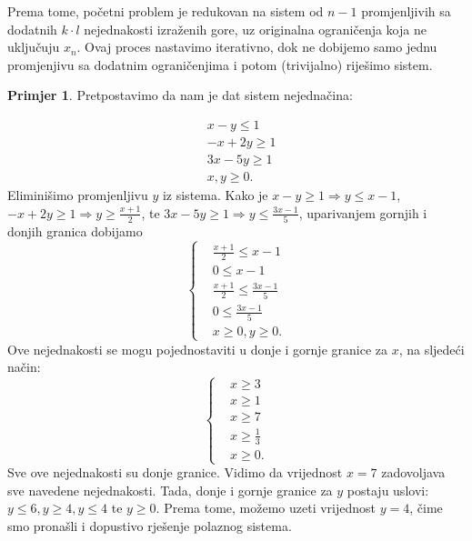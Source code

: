 \documentclass[b5paper, utf8, 11pt, colorlinks]{book}
\theoremstyle{definition}
\newtheorem{primjer}{Primjer}[chapter]
\begin{document}
Prema tome, početni problem je redukovan na sistem od $n-1$ promjenljivih sa dodatnih  $k \cdot l$ nejednakosti izraženih gore, uz originalna ograničenja koja ne uključuju $x_n$. Ovaj proces nastavimo iterativno, dok ne dobijemo samo jednu promjenjivu sa dodatnim ograničenjima  i potom (trivijalno) riješimo sistem. 

\begin{primjer} Pretpostavimo da nam je dat sistem nejednačina:
\end{primjer}
\begin{align*}
	&x - y \leq 1 \\
	&-x + 2y \geq 1 \\
	& 3x - 5y \geq 1 \\
	& x,y \geq 0.
\end{align*}
Eliminišimo promjenljivu $y$ iz sistema. Kako je $x-y \geq 1 \Rightarrow y \leq x -1 $, 
$-x + 2y \geq 1 \Rightarrow y \geq \frac{x+1}{2}$, te $ 3x - 5y \geq 1 \Rightarrow y \leq \frac{3x-1}{5}$, uparivanjem gornjih i donjih granica dobijamo
$$
\begin{cases}
	&\frac{x+1}{2} \leq x-1 \\
	& 0 \leq x-1 \\
	& \frac{x+1}{2} \leq \frac{3x-1}{5} \\
	& 0 \leq \frac{3x-1}{5} \\
	& x \geq 0, y \geq 0.  	
\end{cases}
$$
Ove nejednakosti se mogu pojednostaviti u donje i gornje granice za $x$, na sljedeći način:
$$
\begin{cases}
	&x \geq 3 \\
	& x \geq 1 \\
	& x \geq 7 \\
	& x \geq \frac{1}{3} \\
	& x \geq 0.	
\end{cases}
$$
Sve ove nejednakosti su donje granice. Vidimo da vrijednost $x=7$ zadovoljava sve navedene nejednakosti.
Tada, donje i gornje granice za $y$ postaju uslovi: $y \leq 6, y \geq 4, y \leq 4$ te $y \geq 0$. Prema tome, možemo uzeti vrijednost $y=4$, čime smo pronašli i dopustivo rješenje polaznog sistema. 
\vspace{1.5cm}
\end{document}
